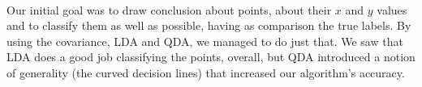 \paragraph{}
Our initial goal was to draw conclusion about points, about their $x$ and $y$ values and to classify them as well as possible, having as comparison the true labels.
By using the covariance, LDA and QDA, we managed to do just that.
We saw that LDA does a good job classifying the points, overall, but QDA introduced a notion of generality (the curved decision lines) that increased our algorithm's accuracy.